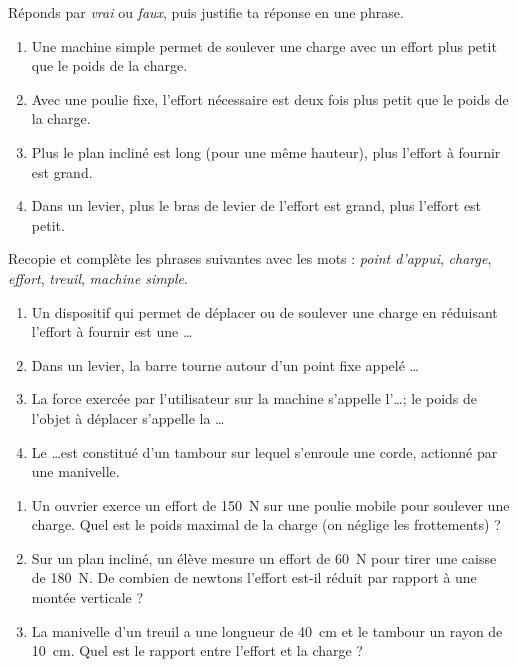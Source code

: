 \documentclass[11pt]{article}
\begin{document}
\begin{exercice}
Réponds par \emph{vrai} ou \emph{faux}, puis justifie ta réponse en une phrase.
\begin{enumerate}
\item Une machine simple permet de soulever une charge avec un effort plus petit que le poids de la charge.
\item Avec une poulie fixe, l'effort nécessaire est deux fois plus petit que le poids de la charge.
\item Plus le plan incliné est long (pour une même hauteur), plus l'effort à fournir est grand.
\item Dans un levier, plus le bras de levier de l'effort est grand, plus l'effort est petit.
\end{enumerate}
\end{exercice}

\begin{exercice}
Recopie et complète les phrases suivantes avec les mots : \emph{point d'appui}, \emph{charge}, \emph{effort}, \emph{treuil}, \emph{machine simple}.
\begin{enumerate}
\item Un dispositif qui permet de déplacer ou de soulever une charge en réduisant l'effort à fournir est une \ldots
\item Dans un levier, la barre tourne autour d'un point fixe appelé \ldots
\item La force exercée par l'utilisateur sur la machine s'appelle l'\ldots ; le poids de l'objet à déplacer s'appelle la \ldots
\item Le \ldots est constitué d'un tambour sur lequel s'enroule une corde, actionné par une manivelle.
\end{enumerate}
\end{exercice}

\begin{exercice}
\begin{enumerate}
\item Un ouvrier exerce un effort de \SI{150}{N} sur une poulie mobile pour soulever une charge. Quel est le poids maximal de la charge (on néglige les frottements) ?
\item Sur un plan incliné, un élève mesure un effort de \SI{60}{N} pour tirer une caisse de \SI{180}{N}. De combien de newtons l'effort est-il réduit par rapport à une montée verticale ?
\item La manivelle d'un treuil a une longueur de \SI{40}{cm} et le tambour un rayon de \SI{10}{cm}. Quel est le rapport entre l'effort et la charge ?
\end{enumerate}
\end{exercice}
\end{document}
